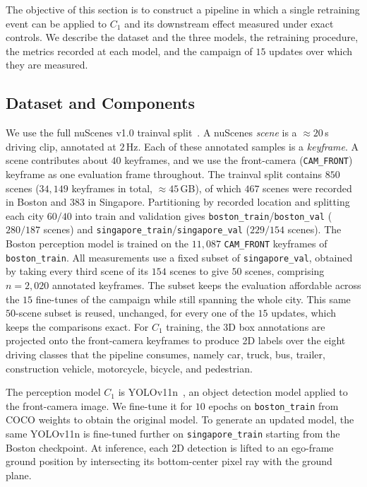 \documentclass[conference]{IEEEtran}
\begin{document}
The objective of this section is to construct a pipeline in which a single
retraining event can be applied to $C_1$ and its downstream effect measured under
exact controls. We describe the dataset and the three models, the retraining
procedure, the metrics recorded at each model, and the campaign of $15$ updates
over which they are measured.

\subsection{Dataset and Components}
We use the full nuScenes v1.0 trainval split~\cite{caesar2020nuscenes}. A
nuScenes \emph{scene} is a $\approx 20$\,s driving clip, annotated at $2$\,Hz. Each
of these annotated samples is a \emph{keyframe}. A scene contributes
about $40$ keyframes, and we use the front-camera (\texttt{CAM\_FRONT}) keyframe
as one evaluation frame throughout. The trainval split contains $850$ scenes
($34{,}149$ keyframes in total, $\approx 45$\,GB), of which $467$ scenes were
recorded in Boston and $383$ in Singapore. Partitioning by recorded location and
splitting each city $60/40$ into train and validation gives
\texttt{boston\_train}/\texttt{boston\_val} ($280/187$ scenes) and
\texttt{singapore\_train}/\texttt{singapore\_val} ($229/154$ scenes). The Boston
perception model is trained on the $11{,}087$ \texttt{CAM\_FRONT} keyframes of
\texttt{boston\_train}. All measurements use a fixed subset of \texttt{singapore\_val}, obtained by
taking every third scene of its $154$ scenes to give $50$ scenes, comprising
$n=2{,}020$ annotated keyframes. The subset keeps the evaluation affordable
across the $15$ fine-tunes of the campaign while still spanning the whole city. This same
$50$-scene subset is reused, unchanged, for every one of the $15$ updates, which
keeps the comparisons exact. For $C_1$ training, the 3D box annotations are
projected onto the front-camera keyframes to produce 2D labels over the eight
driving classes that the pipeline consumes, namely car, truck, bus, trailer,
construction vehicle, motorcycle, bicycle, and pedestrian.

The perception model $C_1$ is YOLOv11n~\cite{jocher2024yolo11}, an object
detection model applied to the front-camera image. We fine-tune it for $10$ epochs on
\texttt{boston\_train} from COCO weights to obtain the original model. To generate
an updated model, the same YOLOv11n is fine-tuned further on
\texttt{singapore\_train} starting from the Boston checkpoint. At inference, each
2D detection is lifted to an ego-frame ground position by intersecting its
bottom-center pixel ray with the ground plane.
\end{document}
